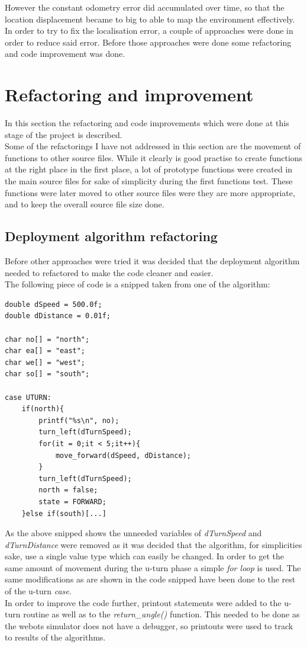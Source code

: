 \begin{flushleft}
However the constant odometry error did accumulated over time, so that the location displacement became to big to able to map the environment effectively. \\
In order to try to fix the localisation error, a couple of approaches were done in order to reduce said error. Before those approaches were done some refactoring and code improvement was done.

\section{Refactoring and improvement}
In this section the refactoring and code improvements which were done at this stage of the project is described. \\
Some of the refactorings I have not addressed in this section are the movement of functions to other source files.
While it clearly is good practise to create functions at the right place in the first place, a lot of prototype functions were created in the main source files for sake of simplicity during the first functions test. These functions were later moved to other source files were they are more appropriate, and to keep the overall source file size done. 

\subsection{Deployment algorithm refactoring}
Before other approaches were tried it was decided that the deployment algorithm needed to refactored to make the code cleaner and easier. \\
The following piece of code is a snipped taken from one of the algorithm:

\begin{lstlisting}[caption={Deployment algorithm refactoring}]
double dSpeed = 500.0f;
double dDistance = 0.01f;

char no[] = "north";
char ea[] = "east";
char we[] = "west";
char so[] = "south";

case UTURN:
	if(north){
		printf("%s\n", no);
		turn_left(dTurnSpeed);
		for(it = 0;it < 5;it++){
			move_forward(dSpeed, dDistance);
		}
		turn_left(dTurnSpeed);
		north = false;
		state = FORWARD;
	}else if(south)[...]
\end{lstlisting}

As the above snipped shows the unneeded variables of \textit{dTurnSpeed} and \textit{dTurnDistance} were removed as it was decided that the algorithm, for simplicities sake, use a single value type which can easily be changed. In order to get the same amount of movement during the u-turn phase a simple \textit{for loop} is used. The same modifications as are shown in the code snipped have been done to the rest of the u-turn \textit{case}. \\
In order to improve the code further, printout statements were added to the u-turn routine as well as to the \textit{return\_angle()} function.
This needed to be done as the webots simulator does not have a debugger, so printouts were used to track to results of the algorithms.


\end{flushleft}
